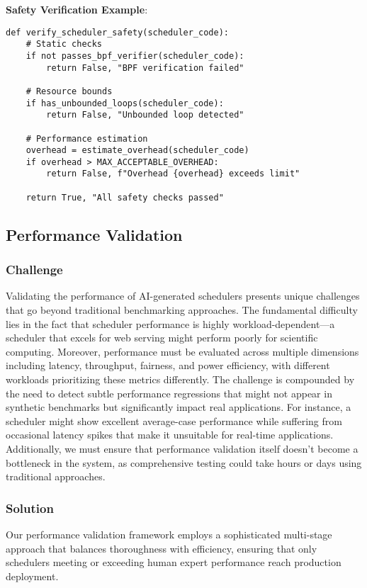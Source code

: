 \textbf{Safety Verification Example}:
\begin{verbatim}
def verify_scheduler_safety(scheduler_code):
    # Static checks
    if not passes_bpf_verifier(scheduler_code):
        return False, "BPF verification failed"
    
    # Resource bounds
    if has_unbounded_loops(scheduler_code):
        return False, "Unbounded loop detected"
    
    # Performance estimation
    overhead = estimate_overhead(scheduler_code)
    if overhead > MAX_ACCEPTABLE_OVERHEAD:
        return False, f"Overhead {overhead} exceeds limit"
    
    return True, "All safety checks passed"
\end{verbatim}

\subsection{Performance Validation}

\subsubsection{Challenge}
Validating the performance of AI-generated schedulers presents unique challenges that go beyond traditional benchmarking approaches. The fundamental difficulty lies in the fact that scheduler performance is highly workload-dependent—a scheduler that excels for web serving might perform poorly for scientific computing. Moreover, performance must be evaluated across multiple dimensions including latency, throughput, fairness, and power efficiency, with different workloads prioritizing these metrics differently. The challenge is compounded by the need to detect subtle performance regressions that might not appear in synthetic benchmarks but significantly impact real applications. For instance, a scheduler might show excellent average-case performance while suffering from occasional latency spikes that make it unsuitable for real-time applications. Additionally, we must ensure that performance validation itself doesn't become a bottleneck in the system, as comprehensive testing could take hours or days using traditional approaches.

\subsubsection{Solution}
Our performance validation framework employs a sophisticated multi-stage approach that balances thoroughness with efficiency, ensuring that only schedulers meeting or exceeding human expert performance reach production deployment.

